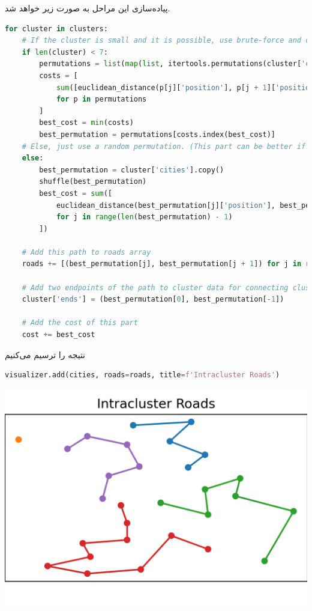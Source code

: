 \documentclass[a4paper, 12pt]{article}
\theoremstyle{definition}
\begin{document}
پیاده‌سازی این مراحل به صورت زیر خواهد شد.

\LTR
\begin{lstlisting}[language=Python]
for cluster in clusters:
    # If the cluster is small and it is possible, use brute-force and check all permutations and find the best.
    if len(cluster) < 7:
        permutations = list(map(list, itertools.permutations(cluster['cities'])))
        costs = [
            sum([euclidean_distance(p[j]['position'], p[j + 1]['position']) for j in range(len(p) - 1)])
            for p in permutations
        ]
        best_cost = min(costs)
        best_permutation = permutations[costs.index(best_cost)]
    # Else, just use a random permutation. (This part can be better if we use other optimization algorithms as a mix.)
    else:
        best_permutation = cluster['cities'].copy()
        shuffle(best_permutation)
        best_cost = sum([
            euclidean_distance(best_permutation[j]['position'], best_permutation[j + 1]['position'])
            for j in range(len(best_permutation) - 1)
        ])

    # Add this path to roads array
    roads += [(best_permutation[j], best_permutation[j + 1]) for j in range(len(best_permutation) - 1)]

    # Add two endpoints of the path to cluster data for connecting clusters
    cluster['ends'] = (best_permutation[0], best_permutation[-1])

    # Add the cost of this part
    cost += best_cost
\end{lstlisting}
\RTL

نتیجه را ترسیم می‌کنیم

\LTR
\begin{lstlisting}[language=Python]
visualizer.add(cities, roads=roads, title=f'Intracluster Roads')
\end{lstlisting}
\RTL

\begin{center}
    \includegraphics[width=.5\textwidth]{1/10.png}
\end{center}
\end{document}
